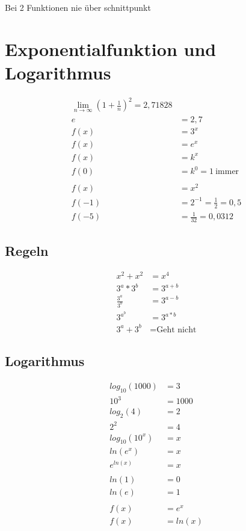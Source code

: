 Bei 2 Funktionen nie über schnittpunkt \\

\section{Exponentialfunktion und Logarithmus}

\begin{align*}
\lim\limits_{n \to \infty}(1 + \frac{1}{n})^2 = 2,71828 \\
e &= 2,7 \\
f(x) &= 3^x \\
f(x) &= e^x  \\
f(x) &= k^x \\
f(0) &= k^0 = 1 \ \text{immer} \\
\\
f(x) &= x^2 \\
f(-1) &= 2^{-1} = \frac{1}{2} = 0,5 \\
f(-5) &= \frac{1}{32} = 0,0312
\end{align*}

\subsection{Regeln}
\begin{align*}
  x^2 + x^2 &= x^4 \\
  3^a * 3^b &= 3^{a+b} \\
  \frac{3^a}{3^b} & = 3^{a-b}\\
  3^{a^b} &= 3^{a*b} \\
  3^a + 3^b &= \text{Geht nicht}
\end{align*}

\subsection{Logarithmus}
\begin{align*}
  log_10 (1000) &= 3 \\
  10^3 &= 1000 \\
  log_2 (4) &= 2 \\
  2^2 &= 4 \\
  log_10 (10^x) &= x \\
  ln(e^x) &= x \\
  e^{ln(x)} &= x \\
  \\
  ln(1) &= 0 \\
  ln(e) &= 1 \\
  \\
  f(x) &= e^x \\
  f(x) &= ln(x)%
\end{align*}

